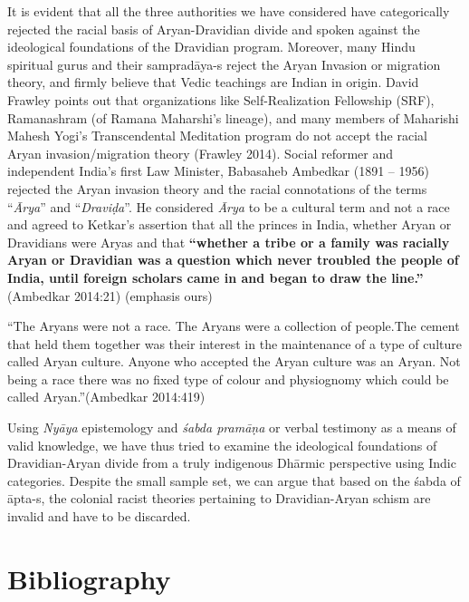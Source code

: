 It is evident that all the three authorities we have considered have categorically rejected the racial basis of Aryan-Dravidian divide and spoken against the ideological foundations of the Dravidian program. Moreover, many Hindu spiritual gurus and their sampradāya-s reject the Aryan Invasion or migration theory, and firmly believe that Vedic teachings are Indian in origin. David Frawley points out that organizations like Self-Realization Fellowship (SRF), Ramanashram (of Ramana Maharshi’s lineage), and many members of Maharishi Mahesh Yogi’s Transcendental Meditation program do not accept the racial Aryan invasion/migration theory (Frawley 2014). Social reformer and independent India’s first Law Minister, Babasaheb Ambedkar (1891 – 1956) rejected the Aryan invasion theory and the racial connotations of the terms “\textit{Ārya}” and “\textit{Draviḍa}”. He considered \textit{Ārya} to be a cultural term and not a race and agreed to Ketkar’s assertion that all the princes in India, whether Aryan or Dravidians were Aryas and that \textbf{“whether a tribe or a family was racially Aryan or Dravidian was a question which never troubled the people of India, until foreign scholars came in and began to draw the line.”} (Ambedkar 2014:21) (emphasis ours)

\begin{myquote}
“The Aryans were not a race. The Aryans were a collection of people.The cement that held them together was their interest in the maintenance of a type of culture called Aryan culture. Anyone who accepted the Aryan culture was an Aryan. Not being a race there was no fixed type of colour and physiognomy which could be called Aryan.”(Ambedkar 2014:419)
\end{myquote}

Using \textit{Nyāya} epistemology and \textit{śabda pramāṇa} or verbal testimony as a means of valid knowledge, we have thus tried to examine the ideological foundations of Dravidian-Aryan divide from a truly indigenous Dhārmic perspective using Indic categories. Despite the small sample set, we can argue that based on the śabda of āpta-s, the colonial racist theories pertaining to Dravidian-Aryan schism are invalid and have to be discarded.

\newpage

\section*{Bibliography}

